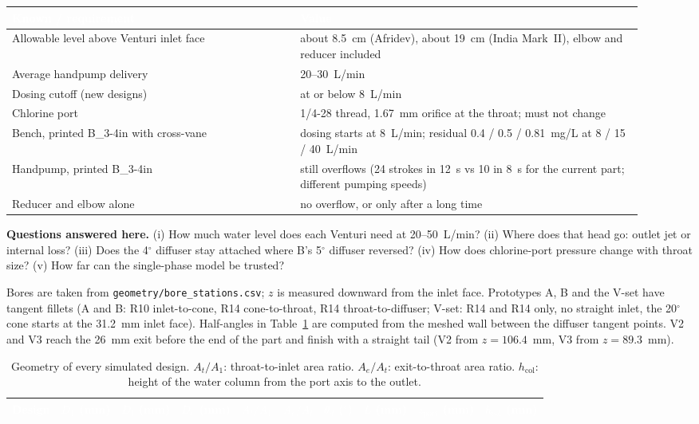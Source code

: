 \documentclass[10pt]{article}
\newcommand{\hd}[1]{\textcolor{white}{\textbf{#1}}}
\newcommand{\sectionhead}[1]{{\large\bfseries\color{Navy}#1}\par\vspace{-2pt}{\color{Blue}\rule{\linewidth}{0.8pt}}\par\vspace{3pt}}
\newcounter{secn}
\newcommand{\numsec}[1]{\par\vspace{6pt}\refstepcounter{secn}\sectionhead{\thesecn\quad #1}}
\numberwithin{equation}{secn}
\numberwithin{figure}{secn}
\numberwithin{table}{secn}
\newcommand{\thead}{\rowcolor{Navy}}
\begin{document}
\begin{center}
\begin{tabular}{|p{0.42\linewidth}|p{0.50\linewidth}|}
\hline
\thead\hd{Known / requirement} & \hd{Value}\\ \hline
Allowable level above Venturi inlet face & about 8.5~cm (Afridev), about 19~cm (India Mark~II), elbow and reducer included \\ \hline
Average handpump delivery & 20--30~L/min \\ \hline
Dosing cutoff (new designs) & at or below 8~L/min \\ \hline
Chlorine port & 1/4-28 thread, 1.67~mm orifice at the throat; must not change \\ \hline
Bench, printed B\_3-4in with cross-vane & dosing starts at 8~L/min; residual 0.4 / 0.5 / 0.81~mg/L at 8 / 15 / 40~L/min \\ \hline
Handpump, printed B\_3-4in & still overflows (24 strokes in 12~s vs 10 in 8~s for the current part; different pumping speeds) \\ \hline
Reducer and elbow alone & no overflow, or only after a long time \\ \hline
\end{tabular}\end{center}

\textbf{Questions answered here.} (i) How much water level does each Venturi need at 20--50~L/min? (ii) Where does that head go: outlet jet or internal loss? (iii) Does the 4$^\circ$ diffuser stay attached where B's 5$^\circ$ diffuser reversed? (iv) How does chlorine-port pressure change with throat size? (v) How far can the single-phase model be trusted?

\numsec{Geometry}\label{sec:geom}

Bores are taken from \texttt{geometry/bore\_stations.csv}; $z$ is measured downward from the inlet face. Prototypes A, B and the V-set have tangent fillets (A and B: R10 inlet-to-cone, R14 cone-to-throat, R14 throat-to-diffuser; V-set: R14 and R14 only, no straight inlet, the 20$^\circ$ cone starts at the 31.2~mm inlet face). Half-angles in Table~\ref{tab:geom} are computed from the meshed wall between the diffuser tangent points. V2 and V3 reach the 26~mm exit before the end of the part and finish with a straight tail (V2 from $z=106.4$~mm, V3 from $z=89.3$~mm).

\begin{table}[htbp]\centering\small
\caption{Geometry of every simulated design. $A_t/A_1$: throat-to-inlet area ratio. $A_e/A_t$: exit-to-throat area ratio. $h_\mathrm{col}$: height of the water column from the port axis to the outlet.}\label{tab:geom}
\begin{tabular}{|l|r|r|r|r|r|r|r|r|r|}
\hline
\thead\hd{Design} & \hd{$D_1$ (mm)} & \hd{$D_t$ (mm)} & \hd{$D_e$ (mm)} & \hd{$A_t/A_1$} & \hd{$A_e/A_t$} & \hd{$\theta_d$ ($^\circ$)} & \hd{$L$ (mm)} & \hd{$z_\mathrm{port}$ (mm)} & \hd{$h_\mathrm{col}$ (mm)}\\ \hline

\end{tabular}
\end{table}
\end{document}
